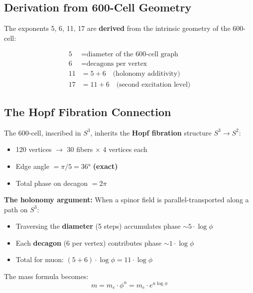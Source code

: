 \documentclass[12pt,a4paper]{article}
\begin{document}
\subsection{Derivation from 600-Cell Geometry}

The exponents 5, 6, 11, 17 are \textbf{derived} from the intrinsic geometry of the 600-cell:

\begin{equation}
\boxed{
\begin{aligned}
5 &= \text{diameter of the 600-cell graph} \\
6 &= \text{decagons per vertex} \\
11 &= 5 + 6 \quad \text{(holonomy additivity)} \\
17 &= 11 + 6 \quad \text{(second excitation level)}
\end{aligned}
}
\end{equation}

\subsection{The Hopf Fibration Connection}

The 600-cell, inscribed in $S^3$, inherits the \textbf{Hopf fibration} structure $S^3 \to S^2$:

\begin{itemize}
    \item 120 vertices $\to$ 30 fibers $\times$ 4 vertices each
    \item Edge angle $= \pi/5 = 36°$ \textbf{(exact)}
    \item Total phase on decagon $= 2\pi$
\end{itemize}

\textbf{The holonomy argument:} When a spinor field is parallel-transported along a path on $S^3$:
\begin{itemize}
    \item Traversing the \textbf{diameter} (5 steps) accumulates phase $\sim 5 \cdot \log\phi$
    \item Each \textbf{decagon} (6 per vertex) contributes phase $\sim 1 \cdot \log\phi$
    \item Total for muon: $(5 + 6) \cdot \log\phi = 11 \cdot \log\phi$
\end{itemize}

The mass formula becomes:
\begin{equation}
m = m_e \cdot \phi^n = m_e \cdot e^{n \log\phi}
\end{equation}
\end{document}
